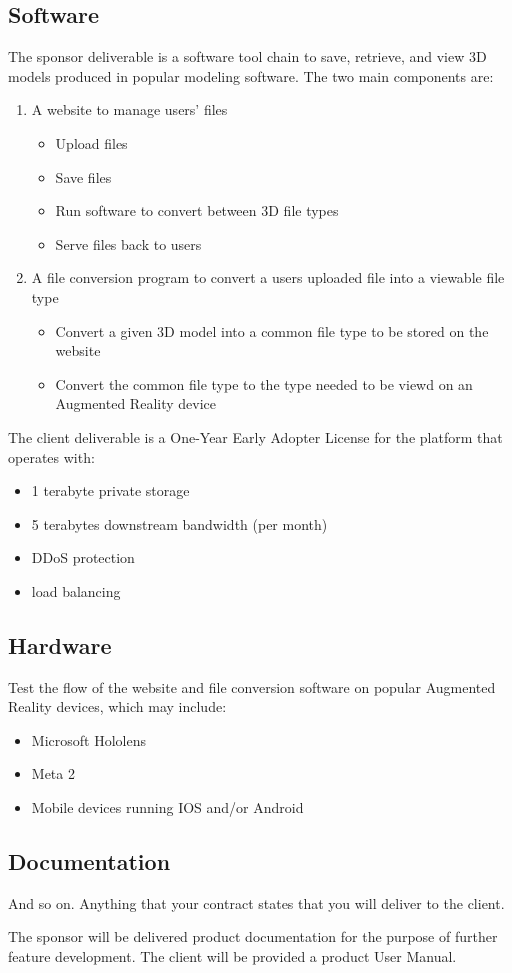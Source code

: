 \subsection{Software}
The sponsor deliverable is a software tool chain to save, retrieve, and view 3D models produced in popular modeling software. The two main components are:

\begin{enumerate}
	\item A website to manage users' files
		\begin{itemize}
			\item Upload files
			\item Save files
			\item Run software to convert between 3D file types
			\item Serve files back to users
		\end{itemize}
	\item A file conversion program to convert a users uploaded file into a viewable file type
		\begin{itemize}
			\item Convert a given 3D model into a common file type to be stored on the website
			\item Convert the common file type to the type needed to be viewd on an Augmented Reality device
		\end{itemize}
\end{enumerate}

\noindent The client deliverable is a One-Year Early Adopter License for the platform that operates with:

\begin{itemize} 
	\item 1 terabyte private storage 
	\item 5 terabytes downstream bandwidth (per month)
	\item DDoS protection
	\item load balancing
\end{itemize} 

\subsection{Hardware}

Test the flow of the website and file conversion software on popular Augmented Reality devices, which may include:
\begin{itemize}
	\item Microsoft Hololens
	\item Meta 2
	\item Mobile devices running IOS and/or Android
\end{itemize}

\subsection{Documentation}
And so on.  Anything that your contract states that you will deliver to the client.

The sponsor will be delivered product documentation for the purpose of further feature development. The client will be provided a product User Manual. 
